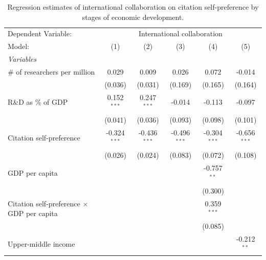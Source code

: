 
\begin{table}[H]
   \caption{Regression estimates of international collaboration on citation self-preference by stages of
   economic development.}
   \centering
   \renewcommand*{\arraystretch}{0.7}
   \begin{tabular}{lccccc}
      \tabularnewline \midrule \midrule
      Dependent Variable: & \multicolumn{5}{c}{International collaboration}\\
      Model:                                            & (1)            & (2)            & (3)            & (4)            & (5)\\  
      \midrule
      \emph{Variables}\\
      \# of researchers per million                     & 0.029          & 0.009          & 0.026          & 0.072          & -0.014\\   
                                                        & (0.036)        & (0.031)        & (0.169)        & (0.165)        & (0.164)\\   
      R\&D as \% of GDP                                 & 0.152$^{***}$  & 0.247$^{***}$  & -0.014         & -0.113         & -0.097\\   
                                                        & (0.041)        & (0.036)        & (0.093)        & (0.098)        & (0.101)\\   
      Citation self-preference                          & -0.324$^{***}$ & -0.436$^{***}$ & -0.496$^{***}$ & -0.304$^{***}$ & -0.656$^{***}$\\   
                                                        & (0.026)        & (0.024)        & (0.083)        & (0.072)        & (0.108)\\   
      GDP per capita                                    &                &                &                & -0.757$^{**}$  &   \\   
                                                        &                &                &                & (0.300)        &   \\   
      Citation self-preference $\times$ GDP per capita  &                &                &                & 0.359$^{***}$  &   \\   
                                                        &                &                &                & (0.085)        &   \\   
      Upper-middle income                               &                &                &                &                & -0.212$^{**}$\\   

\end{tabular}
\end{table}
